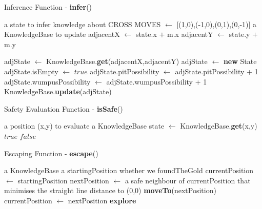 \documentclass[11pt,a4paper]{article}
\begin{document}
\newpage

\begin{algorithm}
\caption{Inference Function - \textbf{infer}()}
\label{infer}
\begin{algorithmic}[1]
\REQUIRE a state to infer knowledge about
\REQUIRE CROSS MOVES $\leftarrow$ [(1,0),(-1,0),(0,1),(0,-1)]
\REQUIRE a KnowledgeBase to update
\STATE adjacentX $\leftarrow$ state.x $+$ m.x 
\STATE adjacentY $\leftarrow$ state.y $+$ m.y

\STATE adjState $\leftarrow$ KnowledgeBase.\textbf{get}(adjacentX,adjacentY)
\ELSE
\STATE adjState $\leftarrow$ \textbf{new} State
\ENDIF
\STATE
{}
\STATE adjState.isEmpty $\leftarrow$ $true$
\ELSE
{}
\STATE adjState.pitPossibility $\leftarrow$ adjState.pitPossibility + 1
\ENDIF
{}
\STATE adjState.wumpusPossibility $\leftarrow$ adjState.wumpusPossibility + 1
\ENDIF
\ENDIF
\STATE KnowledgeBase.\textbf{update}(adjState)
\ENDFOR
\end{algorithmic}
\end{algorithm}

\newpage

\begin{algorithm}
\caption{Safety Evaluation Function - \textbf{isSafe}()}
\label{isSafe}
\begin{algorithmic}[1]
\REQUIRE a position (x,y) to evaluate
\REQUIRE a KnowledgeBase
\STATE state $\leftarrow$ KnowledgeBase.\textbf{get}(x,y)
\RETURN $true$
\ELSE
\RETURN $false$
\ENDIF
\end{algorithmic}
\end{algorithm}

\begin{algorithm}
\caption{Escaping Function - \textbf{escape}()}
\label{escape}
\begin{algorithmic}[1]
\REQUIRE a KnowledgeBase
\REQUIRE a startingPosition
\REQUIRE whether we foundTheGold
\STATE currentPosition $\leftarrow$ startingPosition
\REPEAT
\STATE nextPosition $\leftarrow$ a safe neighbour of currentPosition that minimises the straight line distance to (0,0)
\STATE \textbf{moveTo}(nextPosition)
\STATE currentPosition $\leftarrow$ nextPosition
\STATE \textbf{explore}
\ENDIF
\end{algorithmic}
\end{algorithm}
\end{document}
